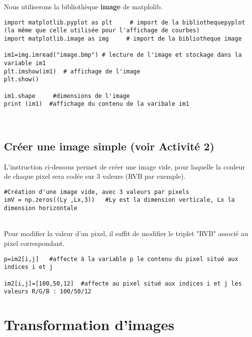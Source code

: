 Nous utiliserons la bibliothèque \textbf{image} de matplolib.
\begin{lstlisting}
import matplotlib.pyplot as plt     # import de la bibliothequepyplot (la même que celle utilisée pour l'affichage de courbes)
import matplotlib.image as img     # import de la bibliotheque image

im1=img.imread("image.bmp") # lecture de l'image et stockage dans la variable im1
plt.imshow(im1)  # affichage de l'image
plt.show()

im1.shape     #dimensions de l'image
print (im1)  #affichage du contenu de la varibale im1

\end{lstlisting}
~~\\

\subsection{Créer une image simple (voir Activité 2)}

L'instruction ci-dessous permet de créer une image vide, pour laquelle la couleur de chaque pixel sera codée sur 3 valeurs (RVB par exemple).

\begin{lstlisting}
#Création d'une image vide, avec 3 valeurs par pixels
imV = np.zeros((Ly ,Lx,3))   #Ly est la dimension verticale, Lx la dimension horizontale
\end{lstlisting}

~~\\ Pour modifier la valeur d'un pixel, il suffit de modifier le triplet "RVB" associé au pixel correspondant.
\begin{lstlisting}
p=im2[i,j]   #affecte à la variable p le contenu du pixel situé aux indices i et j

im2[i,j]=[100,50,12]  #affecte au pixel situé aux indices i et j les valeurs R/G/B : 100/50/12
\end{lstlisting}


\section{Transformation d'images}
